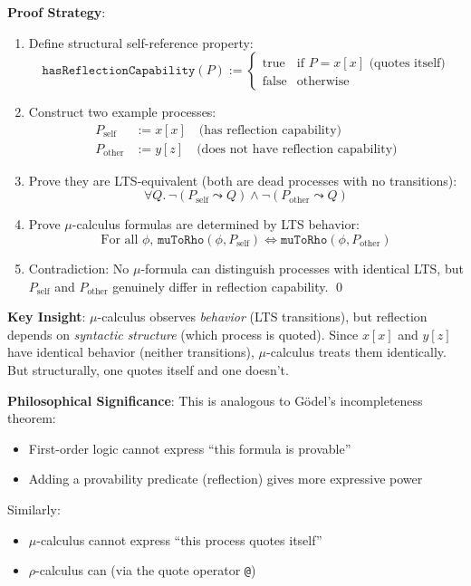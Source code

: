\documentclass[11pt]{article}
\begin{document}
\textbf{Proof Strategy}:
\begin{enumerate}
\item Define structural self-reference property:
\[
\texttt{hasReflectionCapability}(P) := \begin{cases}
\text{true} & \text{if } P = x[x] \text{ (quotes itself)} \\
\text{false} & \text{otherwise}
\end{cases}
\]

\item Construct two example processes:
\begin{align*}
P_{\text{self}} &:= x[x] \quad \text{(has reflection capability)} \\
P_{\text{other}} &:= y[z] \quad \text{(does not have reflection capability)}
\end{align*}

\item Prove they are LTS-equivalent (both are dead processes with no transitions):
\[
\forall Q.\, \neg(P_{\text{self}} \leadsto Q) \land \neg(P_{\text{other}} \leadsto Q)
\]

\item Prove $\mu$-calculus formulas are determined by LTS behavior:
\[
\text{For all } \phi,\, \texttt{muToRho}(\phi, P_{\text{self}}) \iff \texttt{muToRho}(\phi, P_{\text{other}})
\]

\item Contradiction: No $\mu$-formula can distinguish processes with identical LTS, but $P_{\text{self}}$ and $P_{\text{other}}$ genuinely differ in reflection capability. \qed
\end{enumerate}

\textbf{Key Insight}: $\mu$-calculus observes \emph{behavior} (LTS transitions), but reflection depends on \emph{syntactic structure} (which process is quoted). Since $x[x]$ and $y[z]$ have identical behavior (neither transitions), $\mu$-calculus treats them identically. But structurally, one quotes itself and one doesn't.

\textbf{Philosophical Significance}: This is analogous to G\"odel's incompleteness theorem:
\begin{itemize}
\item First-order logic cannot express ``this formula is provable''
\item Adding a provability predicate (reflection) gives more expressive power
\end{itemize}

Similarly:
\begin{itemize}
\item $\mu$-calculus cannot express ``this process quotes itself''
\item $\rho$-calculus can (via the quote operator \texttt{@})
\end{itemize}
\end{document}
